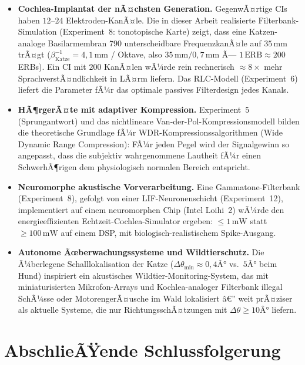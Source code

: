 ﻿\documentclass[12pt,a4paper,titlepage]{report}
\begin{document}
\begin{itemize}[leftmargin=2em]
  \item \textbf{Cochlea-Implantat der nÃ¤chsten Generation.}
    GegenwÃ¤rtige CIs haben $12$--$24$ Elektroden-KanÃ¤le.
    Die in dieser Arbeit realisierte Filterbank-Simulation
    (Experiment~8: tonotopische Karte) zeigt, dass
    eine Katzen-analoge Basilarmembran 790 unterscheidbare
    FrequenzkanÃ¤le auf $35\,\mathrm{mm}$ trÃ¤gt
    ($\beta_\mathrm{Katze}^{-1} = 4{,}1\,\mathrm{mm}$ / Oktave,
    also $35\,\mathrm{mm} / 0{,}7\,\mathrm{mm}$ Ã—
    $1\,\mathrm{ERB}\approx200$ ERBs).
    Ein CI mit $200$ KanÃ¤len wÃ¼rde rein rechnerisch
    $\approx 8\times$ mehr SprachverstÃ¤ndlichkeit in LÃ¤rm liefern.
    Das RLC-Modell (Experiment~6) liefert die Parameter fÃ¼r
    das optimale passives Filterdesign jedes Kanals.
  \item \textbf{HÃ¶rgerÃ¤te mit adaptiver Kompression.}
    Experiment~5 (Sprungantwort) und das nichtlineare
    Van-der-Pol-Kompressionsmodell bilden die theoretische Grundlage
    fÃ¼r WDR-Kompressionssalgorithmen (Wide Dynamic Range Compression):
    FÃ¼r jeden Pegel wird der Signalgewinn so angepasst,
    dass die subjektiv wahrgenommene Lautheit fÃ¼r einen
    SchwerhÃ¶rigen dem physiologisch normalen Bereich entspricht.
  \item \textbf{Neuromorphe akustische Vorverarbeitung.}
    Eine Gammatone-Filterbank (Experiment~8),
    gefolgt von einer LIF-Neuronenschicht (Experiment~12),
    implementiert auf einem neuromorphen Chip (Intel Loihi~2)
    wÃ¼rde den energieeff\-izienten Echtzeit-Cochlea-Simulator ergeben:
    $\leq 1\,\mathrm{mW}$ statt $\geq 100\,\mathrm{mW}$ auf einem DSP,
    mit biologisch-realistischem Spike-Ausgang.
  \item \textbf{Autonome Ãœberwachungssysteme und Wildtierschutz.}
    Die Ã¼berlegene Schalllokalisation der Katze
    ($\Delta\theta_{\min} \approx 0{,}4Â°$ vs.\ $5Â°$ beim Hund)
    inspiriert ein akustisches Wildtier-Monitoring-System,
    das mit miniaturisierten Mikrofon-Arrays und
    Kochlea-analoger Filterbank illegal SchÃ¼sse oder MotorengerÃ¤usche
    im Wald lokalisiert â€” weit prÃ¤ziser als aktuelle Systeme,
    die nur RichtungsschÃ¤tzungen mit
    $\Delta\theta \geq 10Â°$ liefern.
\end{itemize}

\section*{AbschlieÃŸende Schlussfolgerung}
\end{document}
